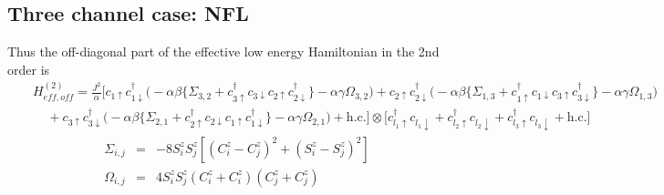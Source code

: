 \documentclass[reprint,prb,superscriptaddress]{revtex4-1}
\begin{document}
\begin{widetext}
\section{Three channel case: NFL}
\label{ap:three-channel}
\noindent Thus the off-diagonal part of the effective low energy Hamiltonian in the 2nd order is
\begin{eqnarray}
&&H_{eff, off}^{(2)} 
= \frac{J^2}{\alpha}\bigg[ c_{1\uparrow}c_{1\downarrow}^{\dagger} \bigg(-\alpha\beta \bigg\{\Sigma_{3,2} + c_{3\uparrow}^{\dagger} c_{3\downarrow} c_{2\uparrow} c_{2\downarrow}^{\dagger} \bigg\}-\alpha\gamma \Omega_{3,2}\bigg) +c_{2\uparrow}c_{2\downarrow}^{\dagger} \bigg(-\alpha\beta \bigg\{\Sigma_{1,3} + c_{1\uparrow}^{\dagger} c_{1\downarrow} c_{3\uparrow} c_{3\downarrow}^{\dagger} \bigg\}-\alpha\gamma \Omega_{1,3}\bigg) \nonumber\\
&&~~~~~+c_{3\uparrow}c_{3\downarrow}^{\dagger} \bigg(-\alpha\beta \bigg\{\Sigma_{2,1} + c_{2\uparrow}^{\dagger} c_{2\downarrow} c_{1\uparrow} c_{1\downarrow}^{\dagger} \bigg\}-\alpha\gamma \Omega_{2,1}\bigg) + \textrm{h.c.} \bigg]
 \otimes \bigg[ c_{l_1\uparrow}^{\dagger} c_{l_1\downarrow} +c_{l_2\uparrow}^{\dagger} c_{l_2\downarrow} + c_{l_3\uparrow}^{\dagger} c_{l_3\downarrow} + \textrm{h.c.}\bigg] \nonumber
\end{eqnarray} 
 \begin{eqnarray}
\Sigma_{i,j} &=&-8S_i^zS_j^z  [  (C^z_i-C^z_j  )^2  + (S_i^z-S_j^z  )^2  ] \\
\Omega_{i,j} &=& 4S_i^z S_j^z (C_i^z+C_i^z)(C_j^z+C_j^z)
\end{eqnarray}
\end{widetext}
 
\end{document}
